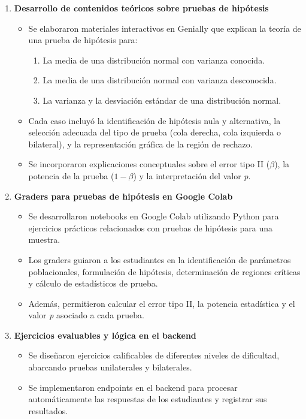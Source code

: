 \documentclass[letter,oneside,12pt,spanish]{report}
\begin{document}
\begin{enumerate}
	\item \textbf{Desarrollo de contenidos teóricos sobre pruebas de hipótesis}  
	\begin{itemize}
		\item Se elaboraron materiales interactivos en Genially que explican la teoría de una prueba de hipótesis para:
		\begin{enumerate}
			\item La media de una distribución normal con varianza conocida.
			\item La media de una distribución normal con varianza desconocida.
			\item La varianza y la desviación estándar de una distribución normal.
		\end{enumerate}
		\item Cada caso incluyó la identificación de hipótesis nula y alternativa, la selección adecuada del tipo de prueba (cola derecha, cola izquierda o bilateral), y la representación gráfica de la región de rechazo.
		\item Se incorporaron explicaciones conceptuales sobre el error tipo II (\(\beta\)), la potencia de la prueba (\(1 - \beta\)) y la interpretación del valor \textit{p}.
	\end{itemize}
	
	\item \textbf{Graders para pruebas de hipótesis en Google Colab}  
	\begin{itemize}
		\item Se desarrollaron notebooks en Google Colab utilizando Python para ejercicios prácticos relacionados con pruebas de hipótesis para una muestra.
		\item Los graders guiaron a los estudiantes en la identificación de parámetros poblacionales, formulación de hipótesis, determinación de regiones críticas y cálculo de estadísticos de prueba.
		\item Además, permitieron calcular el error tipo II, la potencia estadística y el valor \textit{p} asociado a cada prueba.
	\end{itemize}
	
	\item \textbf{Ejercicios evaluables y lógica en el backend}  
	\begin{itemize}
		\item Se diseñaron ejercicios calificables de diferentes niveles de dificultad, abarcando pruebas unilaterales y bilaterales.
		\item Se implementaron endpoints en el backend para procesar automáticamente las respuestas de los estudiantes y registrar sus resultados.
	\end{itemize}
\end{enumerate}
\end{document}
